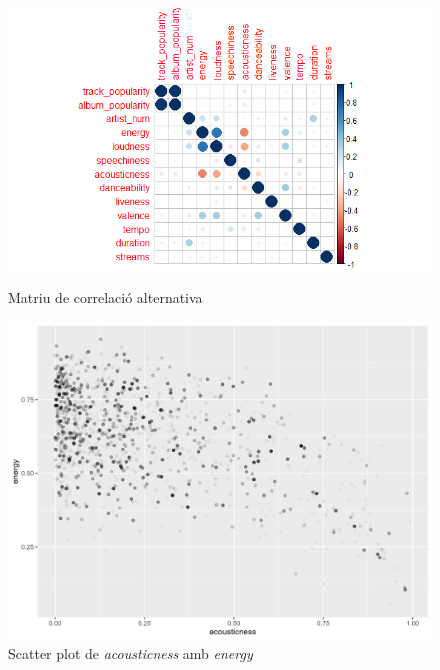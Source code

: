 \begin{figure}[H]
\centering
    \begin{minipage}{.4\textwidth}
        \centering
        \includegraphics[width=0.95\linewidth]{Images/2_Bivariate/correlationdots.png}
        \caption{Matriu de correlació alternativa}
        \label{fig:BivariateR_correlationdots}
    \end{minipage}%
    \begin{minipage}{.4\textwidth}
        \centering
        \includegraphics[width=0.95\linewidth]{Images/2_Bivariate/acousticenergy.png}
        \caption{Scatter plot de \textit{acousticness} amb \textit{energy}}
        \label{fig:BivariateR_acousticenergy}
    \end{minipage}%
\end{figure}
